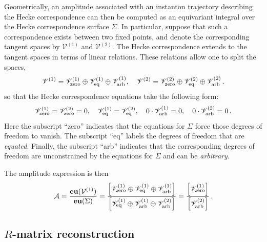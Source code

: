 \documentclass[10pt]{article}
\theoremstyle{definition}
\def\CA{{\cal A}}
\def\CV {{\cal V}}
\def\sV{{\mathscr{V}}}
\numberwithin{equation}{section}
\begin{document}
Geometrically, an amplitude associated with an instanton trajectory describing the Hecke correspondence can then be computed as an equivariant integral over the Hecke correspondence surface $\Sigma$.
In particular, suppose that such a correspondence exists between two fixed points, and denote the corresponding tangent spaces by $\sV^{(1)}$ and $\sV^{(2)}$.
The Hecke correspondence extends to the tangent spaces in terms of linear relations.
These relations allow one to split the spaces,
\begin{equation}
	\sV^{(1)}=\sV^{(1)}_{\rm zero}\oplus\sV^{(1)}_{\rm eq}\oplus \sV^{(1)}_{\rm arb},\quad \sV^{(2)}=\sV^{(2)}_{\rm zero}\oplus\sV^{(2)}_{\rm eq}\oplus \sV^{(2)}_{\rm arb}\,.
\end{equation} 
so that the Hecke correspondence equations take the following form:
\begin{equation}\label{decomp}
	\sV^{(1)}_{\rm zero}=\sV^{(2)}_{\rm zero}=0,\quad \sV^{(1)}_{\rm eq}=\sV^{(2)}_{\rm eq},\quad 0\cdot \sV^{(1)}_{\rm arb}=0,\quad 0\cdot\sV^{(2)}_{\rm arb}=0\,.
\end{equation}
Here the subscript ``zero'' indicates that the equations for $\Sigma$ force those degrees of freedom to vanish.
The subscript ``eq'' labels the degrees of freedom that are \emph{equated}.
Finally, the subscript ``arb'' indicates that the corresponding degrees of freedom are unconstrained by the equations for $\Sigma$ and can be \emph{arbitrary}.

The amplitude expression is then
\begin{equation}\label{amplitude}
	\CA=\frac{{\bf eu}(\CV^{(1)})}{{\bf eu}(\Sigma)}=\frac{\left[\sV^{(1)}_{\rm zero}\oplus\sV^{(1)}_{\rm eq}\oplus \sV^{(1)}_{\rm arb}\right]}{\left[\sV^{(1)}_{\rm eq}\oplus \sV^{(1)}_{\rm arb}\oplus \sV^{(2)}_{\rm arb}\right]}=\frac{\left[\sV^{(1)}_{\rm zero}\right]}{\left[\sV_{\rm arb}^{(2)}\right]}\,.
\end{equation}



\subsection{\texorpdfstring{$R$}{R}-matrix reconstruction}\label{sec:R-mat_Berry}
\end{document}
